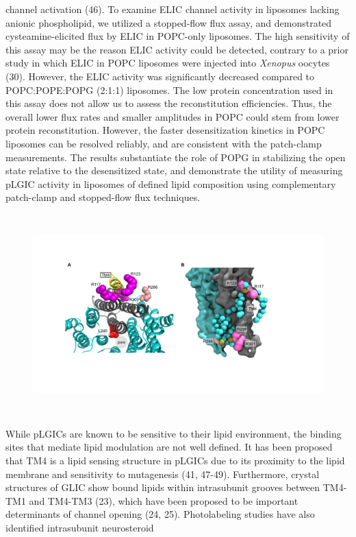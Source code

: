 channel activation (46). To examine ELIC channel activity in liposomes
lacking anionic phospholipid, we utilized a stopped-flow flux assay, and
demonstrated cysteamine-elicited flux by ELIC in POPC-only liposomes.
The high sensitivity of this assay may be the reason ELIC activity could
be detected, contrary to a prior study in which ELIC in POPC liposomes
were injected into \emph{Xenopus} oocytes (30). However, the ELIC
activity was significantly decreased compared to POPC:POPE:POPG (2:1:1)
liposomes. The low protein concentration used in this assay does not
allow us to assess the reconstitution efficiencies. Thus, the overall
lower flux rates and smaller amplitudes in POPC could stem from lower
protein reconstitution. However, the faster desensitization kinetics in
POPC liposomes can be resolved reliably, and are consistent with the
patch-clamp measurements. The results substantiate the role of POPG in
stabilizing the open state relative to the desensitized state, and
demonstrate the utility of measuring pLGIC activity in liposomes of
defined lipid composition using complementary
patch-clamp
and stopped-flow flux techniques.
\begin{figure}
\includegraphics[width=6.38681in,height=3.04514in]{./pandoc_test/media/image10.pdf}
\end{figure}
While pLGICs are known to be sensitive to their lipid environment, the
binding sites that mediate lipid modulation are not well defined. It has
been proposed that TM4 is a lipid sensing structure in pLGICs due to its
proximity to the lipid membrane and sensitivity to mutagenesis (41,
47-49). Furthermore, crystal structures of GLIC show bound lipids within
intrasubunit grooves between TM4-TM1 and TM4-TM3 (23), which have been
proposed to be important determinants of channel opening (24, 25).
Photolabeling studies have also identified intrasubunit neurosteroid
